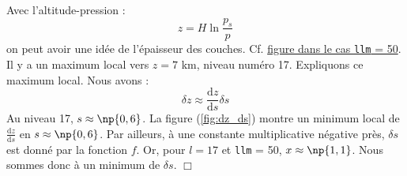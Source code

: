 \documentclass[a4paper,french]{article}
\newcommand{\ud}{\mathrm{d}}
\begin{document}
Avec l'altitude-pression :
\begin{displaymath}
  z = H \ln \frac{p_s}{p}
\end{displaymath}
on peut avoir une idée de l'épaisseur des couches. Cf.
\href{file:///../delta_z.pdf}{figure dans le cas \texttt{llm} = 50}. Il
y a un maximum local vers $z = 7$ km, niveau numéro 17. Expliquons ce
maximum local. Nous avons :
\begin{displaymath}
  \delta z \approx \frac{\ud z}{\ud s} \delta s
\end{displaymath}
Au niveau 17, $s \approx \np{0,6}$. La figure (\ref{fig:dz_ds})
montre un minimum local de $\frac{\ud z}{\ud s}$ en $s \approx
\np{0,6}$. Par ailleurs, à une constante multiplicative négative
près, $\delta s$ est donné par la fonction $f$. Or, pour $l = 17$ et
\verb+llm+ = 50, $x \approx \np{1,1}$. Nous sommes donc à un
minimum de $\delta s$. $\Box$
\end{document}
